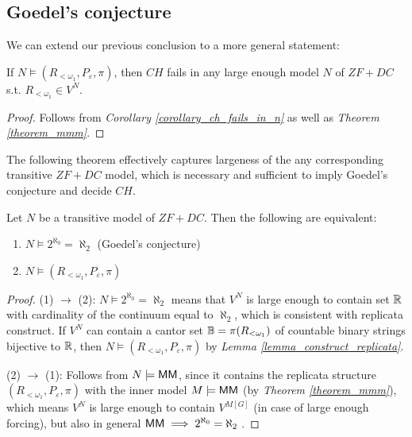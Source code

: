 \subsection{Goedel's conjecture}\label{subsection_goedels_conjecture}

We can extend our previous conclusion to a more general statement:

\begin{corollary}\label{corollary_ch_fails_in_large_zf_dc}
    If $N \models (R_{<\omega_1}, P_\varepsilon, \pi)$, then $CH$ fails in any large enough model $N$ of $ZF + DC$ s.t. $R_{<\omega_1} \in V^N$.
\end{corollary}
\begin{proof}
    Follows from \textit{Corollary \ref{corollary_ch_fails_in_n}} as well as \textit{Theorem \ref{theorem_mmm}}.
\end{proof}

The following theorem effectively captures largeness of the any corresponding transitive $ZF+DC$ model, which is necessary and sufficient to imply Goedel's conjecture and decide $CH$.

\begin{theorem}\label{theorem_largness_criteria}
    Let $N$ be a transitive model of $ZF+DC$. Then the following are equivalent:
    \begin{enumerate}
        \item $N \models 2^{\aleph_0} = \aleph_2$ (Goedel's conjecture)
        \item $N \models (R_{<\omega_1}, P_\varepsilon, \pi)$
    \end{enumerate}
\end{theorem}
\begin{proof}
    (1) $\to$ (2): $N \models 2^{\aleph_0} = \aleph_2$ means that $V^N$ is large enough to contain set $\mathbb{R}$ with cardinality of the continuum equal to $\aleph_2$, which is consistent with replicata construct. If $V^N$ can contain a cantor set $\mathbb{B} = \pi(R_{<\omega_1})$ of countable binary strings bijective to $\mathbb{R}$, then $N \models (R_{<\omega_1}, P_\varepsilon, \pi)$ by \textit{Lemma \ref{lemma_construct_replicata}}.
    
    (2) $\to$ (1): Follows from $N \models {\sf MM}$, since it contains the replicata structure $(R_{<\omega_1}, P_\varepsilon, \pi)$ with the inner model $M \models {\sf MM}$ (by \textit{Theorem \ref{theorem_mmm}}), which means $V^N$ is large enough to contain $V^{M[G]}$ (in case of large enough forcing), but also in general ${\sf MM} \implies 2^{\aleph_0} = \aleph_2$ \cite{jech2003set,aspero2021sf}.
\end{proof}


